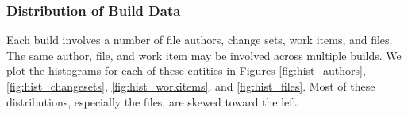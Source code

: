 \documentclass[12pt,oneside]{book}
\begin{document}
\subsubsection{Distribution of Build Data}


Each build involves a number of file authors, change sets, work items, and files. The same author, file, and work item may be involved across multiple builds.
We plot the histograms for each of these entities in Figures \ref{fig:hist_authors}, \ref{fig:hist_changesets}, \ref{fig:hist_workitems}, and \ref{fig:hist_files}.
Most of these distributions, especially the files, are skewed toward the left. 

\end{document}
